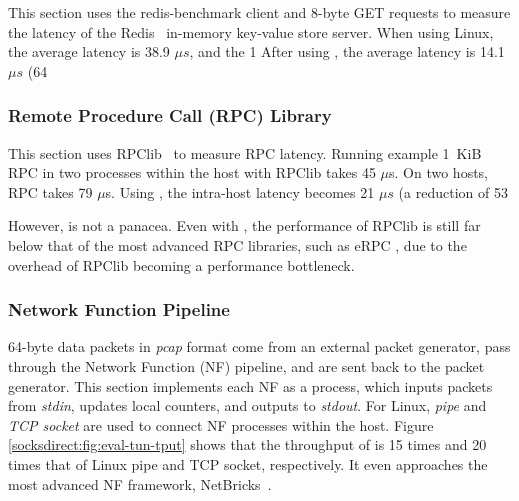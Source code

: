 This section uses the redis-benchmark client and 8-byte GET requests to measure the latency of the Redis~ \cite {redis} in-memory key-value store server.
When using Linux, the average latency is 38.9 $ \mu s $, and the 1%
After using \sys {}, the average latency is 14.1 $ \mu s $ (64%

\subsubsection{Remote Procedure Call (RPC) Library}

This section uses RPClib~ \cite {rpclib} to measure RPC latency.
Running example 1~KiB RPC in two processes within the host with RPClib takes 45 $ \mu $s. On two hosts, RPC takes 79 $ \mu$s.
Using \sys {}, the intra-host latency becomes 21 $ \mu s $ (a reduction of 53%

However, \sys{} is not a panacea. Even with \libipc{}, the performance of RPClib is still far below that of the most advanced RPC libraries, such as eRPC \cite{kalia2018datacenter}, due to the overhead of RPClib becoming a performance bottleneck.

\subsubsection{Network Function Pipeline}

64-byte data packets in \emph{pcap} format come from an external packet generator, pass through the Network Function (NF) pipeline, and are sent back to the packet generator.
This section implements each NF as a process, which inputs packets from \emph{stdin}, updates local counters, and outputs to \emph{stdout}.
For Linux, \emph{pipe} and \emph{TCP socket} are used to connect NF processes within the host.
Figure \ref{socksdirect:fig:eval-tun-tput} shows that the throughput of \sys{} is 15 times and 20 times that of Linux pipe and TCP socket, respectively.
It even approaches the most advanced NF framework, NetBricks~\cite{panda2016netbricks}.

